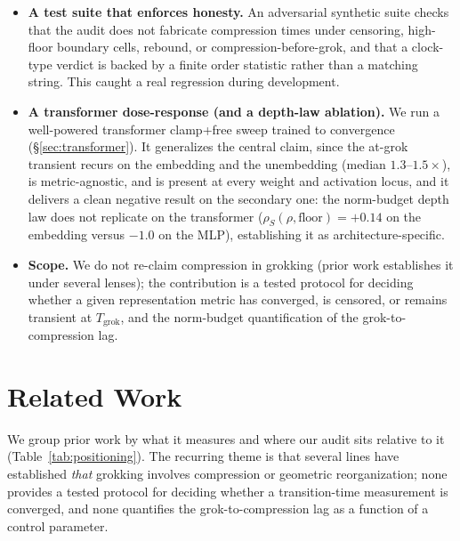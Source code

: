 \documentclass[11pt]{article}
\begin{document}
\begin{itemize}
high-budget cell starts compression from an already-lower rank. We are careful to scope this, and then to
break it ourselves: the depth law's \emph{direction} is specific to the norm-clamp protocol (a free
weight-decay sweep orders the floor oppositely; \S\ref{sec:limitations}), and a transformer clamp sweep
trained to convergence shows the floor does not order with the budget at all on a second architecture
(\S\ref{sec:transformer}), so we report it as an MLP-specific regularity rather than a protocol- or
architecture-independent law.
\item \textbf{A test suite that enforces honesty.} An adversarial synthetic suite checks that the audit
does not fabricate compression times under censoring, high-floor boundary cells, rebound, or
compression-before-grok, and that a clock-type verdict is backed by a finite order
statistic rather than a matching string. This caught a real regression during development.
\item \textbf{A transformer dose-response (and a depth-law ablation).} We run a well-powered transformer
clamp+free sweep trained to convergence (\S\ref{sec:transformer}). It generalizes the central claim, since the
at-grok transient recurs on the embedding and the unembedding (median $1.3$--$1.5\times$), is
metric-agnostic, and is present at every weight and activation locus, and it delivers a clean negative
result on the secondary one: the norm-budget depth law does not replicate on the transformer
($\rho_S(\rho,\text{floor})=+0.14$ on the embedding versus $-1.0$ on the MLP), establishing it as
architecture-specific.
\item \textbf{Scope.} We do not re-claim compression in grokking (prior work establishes it under
several lenses); the contribution is a tested protocol for deciding whether a given representation
metric has converged, is censored, or remains transient at $T_{\mathrm{grok}}$, and the norm-budget
quantification of the grok-to-compression lag.
\end{itemize}

\section{Related Work}
We group prior work by what it measures and where our audit sits relative to it
(Table~\ref{tab:positioning}). The recurring theme is
that several lines have established \emph{that} grokking involves compression or geometric
reorganization; none provides a tested protocol for deciding whether a transition-time measurement is
converged, and none quantifies the grok-to-compression lag as a function of a control parameter.
\end{document}
